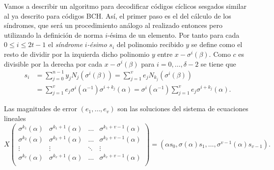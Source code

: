 Vamos a describir un algoritmo para decodificar códigos cíclicos sesgados similar al ya descrito para códigos BCH.
Así, el primer paso es el del cálculo de los síndromes, que será un procedimiento análogo al realizado entonces pero utilizando la definición de norma \(i\)-ésima de un elemento.
Por tanto para cada \(0 \leq i \leq 2t - 1\) el \emph{síndrome} \(i\)\emph{-ésimo} \(s_i\) del polinomio recibido \(y\) se define como el resto de dividir por la izquierda dicho polinomio \(y\) entre \(x - \sigma^{i}(\beta)\).
Como \(c\) es divisible por la derecha por cada \(x - \sigma^{i}(\beta)\) para \(i = 0, \dots, \delta - 2\) se tiene que 
\begin{align}
  s_i &= \sum_{j = 0}^{n-1}y_jN_j(\sigma^{i}(\beta)) = \sum_{j=1}^{v}e_jN_{k_j}(\sigma^{i}(\beta))\nonumber\\
   &= \sum_{j = 1}^{v}e_j\sigma^{i}(\alpha^{-1})\sigma^{i+k_j}(\alpha) = \sigma^{i}(\alpha^{-1})\sum_{j = 1}^{v}e_j\sigma^{i+k_j}(\alpha).
   \label{eq:sindromes-sesgados}
\end{align}

\begin{proposition}
  \label{prop:pgz-sesgados-magnitudes-error}
  Las magnitudes de error \((e_{1}, \dots, e_{v})\) son las soluciones del sistema de ecuaciones lineales
  \[
    X \begin{pmatrix}
     \sigma^{k_1}(\alpha) & \sigma^{k_1 + 1}(\alpha) & \dots & \sigma^{k_1 + v - 1}(\alpha)\\ 
     \sigma^{k_2}(\alpha) & \sigma^{k_2 + 1}(\alpha) & \dots & \sigma^{k_2 + v - 1}(\alpha)\\ 
     \vdots & \vdots & \ddots & \vdots\\ 
     \sigma^{k_v}(\alpha) & \sigma^{k_v + 1}(\alpha) & \dots & \sigma^{k_v + v - 1}(\alpha)\\ 
    \end{pmatrix}
    = (\alpha s_0, \sigma(\alpha)s_1, \dots, \sigma^{v-1}(\alpha)s_{v-1}).
  \]
\end{proposition}

